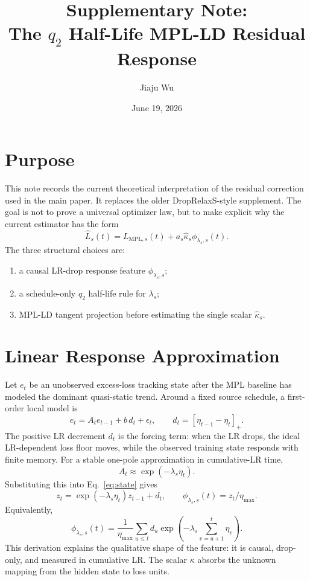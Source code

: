 \documentclass{article}
\title{Supplementary Note:\\
The \(q_2\) Half-Life MPL-LD Residual Response}
\author{Jiaju Wu}
\date{June 19, 2026}
\newcommand{\MPL}{\mathrm{MPL}}
\begin{document}
\maketitle

\section{Purpose}
This note records the current theoretical interpretation of the residual correction used in
the main paper.  It replaces the older DropRelaxS-style supplement.  The goal is not to
prove a universal optimizer law, but to make explicit why the current estimator has the form
\begin{equation}\label{eq:supp_main}
  \widehat L_s(t)
  =
  L_{\MPL,s}(t)
  +
  a_s\widehat\kappa_s\phi_{\lambda_s,s}(t).
\end{equation}
The three structural choices are:
\begin{enumerate}
  \item a causal LR-drop response feature \(\phi_{\lambda_s,s}\);
  \item a schedule-only \(q_2\) half-life rule for \(\lambda_s\);
  \item MPL-LD tangent projection before estimating the single scalar \(\widehat\kappa_s\).
\end{enumerate}

\section{Linear Response Approximation}
Let \(e_t\) be an unobserved excess-loss tracking state after the MPL baseline has modeled the
dominant quasi-static trend.  Around a fixed source schedule, a first-order local model is
\begin{equation}\label{eq:state}
  e_t=A_t e_{t-1}+b\,d_t+\epsilon_t,
  \qquad
  d_t=[\eta_{t-1}-\eta_t]_+ .
\end{equation}
The positive LR decrement \(d_t\) is the forcing term: when the LR drops, the ideal
LR-dependent loss floor moves, while the observed training state responds with finite memory.
For a stable one-pole approximation in cumulative-LR time,
\begin{equation}
  A_t\approx \exp(-\lambda_s\eta_t).
\end{equation}
Substituting this into Eq.~\eqref{eq:state} gives
\begin{equation}\label{eq:z}
  z_t=\exp(-\lambda_s\eta_t)z_{t-1}+d_t,\qquad
  \phi_{\lambda_s,s}(t)=z_t/\eta_{\max}.
\end{equation}
Equivalently,
\begin{equation}
  \phi_{\lambda_s,s}(t)
  =
  \frac{1}{\eta_{\max}}
  \sum_{u\le t}d_u
  \exp\!\left(-\lambda_s\sum_{v=u+1}^{t}\eta_v\right).
\end{equation}
This derivation explains the qualitative shape of the feature: it is causal, drop-only, and
measured in cumulative LR.  The scalar \(\kappa\) absorbs the unknown mapping from the hidden
state to loss units.
\end{document}
